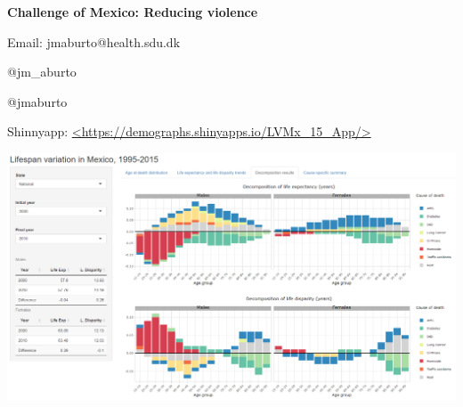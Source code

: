 \documentclass[xcolor={dvipsnames}]{beamer}
\begin{document}
\begin{frame}
 \begin{center}
	\begin{center}
	 \textbf{Challenge of Mexico: Reducing violence}
	\end{center}

	\bigskip

Email: jmaburto@health.sdu.dk 

\faTwitter \quad  @jm\_aburto 

\faGithub \quad @jmaburto 

Shinnyapp: \url{<https://demographs.shinyapps.io/LVMx_15_App/>}


\includegraphics[scale=0.23]{Figures/Shinnyapp_fig} \\   

 

\end{center}
 
 

\end{frame}
\end{document}
